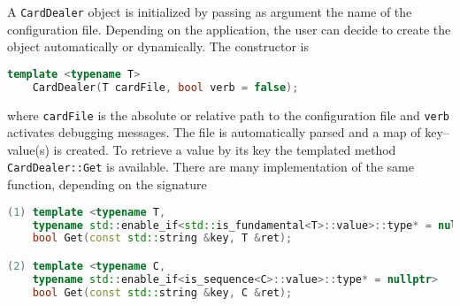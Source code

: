 \documentclass[a4paper, 11pt]{article}
\begin{document}
A \texttt{CardDealer} object is initialized by passing as argument the name of the configuration file.
Depending on the application, the user can decide to create the object automatically or dynamically.
The constructor is
\begin{lstlisting}[language=C++]
    template <typename T>
    CardDealer(T cardFile, bool verb = false);
\end{lstlisting}
where \texttt{cardFile} is the absolute or relative path to the configuration file and %
\texttt{verb} activates debugging messages.
The file is automatically parsed and a map of key--value(s) is created.
To retrieve a value by its key the templated method \texttt{CardDealer::Get} is available.
There are many implementation of the same function, depending on the signature
\begin{lstlisting}[language=C++]
(1) template <typename T,
    typename std::enable_if<std::is_fundamental<T>::value>::type* = nullptr>
    bool Get(const std::string &key, T &ret);

(2) template <typename C,
    typename std::enable_if<is_sequence<C>::value>::type* = nullptr>
    bool Get(const std::string &key, C &ret);
\end{lstlisting}
\end{document}
